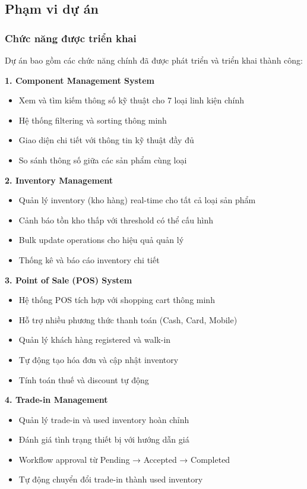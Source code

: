 \documentclass[12pt,a4paper]{article}
\begin{document}
\subsection{Phạm vi dự án}
\subsubsection{Chức năng được triển khai}
Dự án bao gồm các chức năng chính đã được phát triển và triển khai thành công:

\textbf{1. Component Management System}
\begin{itemize}
    \item Xem và tìm kiếm thông số kỹ thuật cho 7 loại linh kiện chính
    \item Hệ thống filtering và sorting thông minh
    \item Giao diện chi tiết với thông tin kỹ thuật đầy đủ
    \item So sánh thông số giữa các sản phẩm cùng loại
\end{itemize}

\textbf{2. Inventory Management}
\begin{itemize}
    \item Quản lý inventory (kho hàng) real-time cho tất cả loại sản phẩm
    \item Cảnh báo tồn kho thấp với threshold có thể cấu hình
    \item Bulk update operations cho hiệu quả quản lý
    \item Thống kê và báo cáo inventory chi tiết
\end{itemize}

\textbf{3. Point of Sale (POS) System}
\begin{itemize}
    \item Hệ thống POS tích hợp với shopping cart thông minh
    \item Hỗ trợ nhiều phương thức thanh toán (Cash, Card, Mobile)
    \item Quản lý khách hàng registered và walk-in
    \item Tự động tạo hóa đơn và cập nhật inventory
    \item Tính toán thuế và discount tự động
\end{itemize}

\textbf{4. Trade-in Management}
\begin{itemize}
    \item Quản lý trade-in và used inventory hoàn chỉnh
    \item Đánh giá tình trạng thiết bị với hướng dẫn giá
    \item Workflow approval từ Pending → Accepted → Completed
    \item Tự động chuyển đổi trade-in thành used inventory
\end{itemize}
\end{document}
